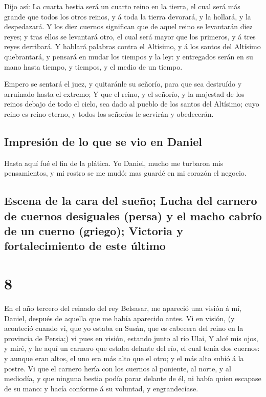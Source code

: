  Dijo así: La cuarta bestia será un cuarto reino en la
tierra, el cual será más grande que todos los otros reinos, y á toda la
tierra devorará, y la hollará, y la despedazará.  Y los
diez cuernos significan que de aquel reino se levantarán diez reyes; y
tras ellos se levantará otro, el cual será mayor que los primeros, y á
tres reyes derribará.  Y hablará palabras contra el
Altísimo, y á los santos del Altísimo quebrantará, y pensará en mudar
los tiempos y la ley: y entregados serán en su mano hasta tiempo, y
tiempos, y el medio de un tiempo.

 Empero se sentará el juez, y quitaránle su señorío, para
que sea destruído y arruinado hasta el extremo;  Y que el
reino, y el señorío, y la majestad de los reinos debajo de todo el
cielo, sea dado al pueblo de los santos del Altísimo; cuyo reino es
reino eterno, y todos los señoríos le servirán y obedecerán.

\hypertarget{impresiuxf3n-de-lo-que-se-vio-en-daniel}{%
\subsection{Impresión de lo que se vio en
Daniel}\label{impresiuxf3n-de-lo-que-se-vio-en-daniel}}

 Hasta aquí fué el fin de la plática. Yo Daniel, mucho me
turbaron mis pensamientos, y mi rostro se me mudó: mas guardé en mi
corazón el negocio.

\hypertarget{escena-de-la-cara-del-sueuxf1o-lucha-del-carnero-de-cuernos-desiguales-persa-y-el-macho-cabruxedo-de-un-cuerno-griego-victoria-y-fortalecimiento-de-este-uxfaltimo}{%
\subsection{Escena de la cara del sueño; Lucha del carnero de cuernos
desiguales (persa) y el macho cabrío de un cuerno (griego); Victoria y
fortalecimiento de este
último}\label{escena-de-la-cara-del-sueuxf1o-lucha-del-carnero-de-cuernos-desiguales-persa-y-el-macho-cabruxedo-de-un-cuerno-griego-victoria-y-fortalecimiento-de-este-uxfaltimo}}

\hypertarget{section-27-8}{%
\section{8}\label{section-27-8}}

 En el año tercero del reinado del rey Belsasar, me
apareció una visión á mí, Daniel, después de aquella que me había
aparecido antes.  Vi en visión, (y aconteció cuando vi,
que yo estaba en Susán, que es cabecera del reino en la provincia de
Persia;) vi pues en visión, estando junto al río Ulai,  Y
alcé mis ojos, y miré, y he aquí un carnero que estaba delante del río,
el cual tenía dos cuernos: y aunque eran altos, el uno era más alto que
el otro; y el más alto subió á la postre.  Vi que el
carnero hería con los cuernos al poniente, al norte, y al mediodía, y
que ninguna bestia podía parar delante de él, ni había quien escapase de
su mano: y hacía conforme á su voluntad, y engrandecíase.

